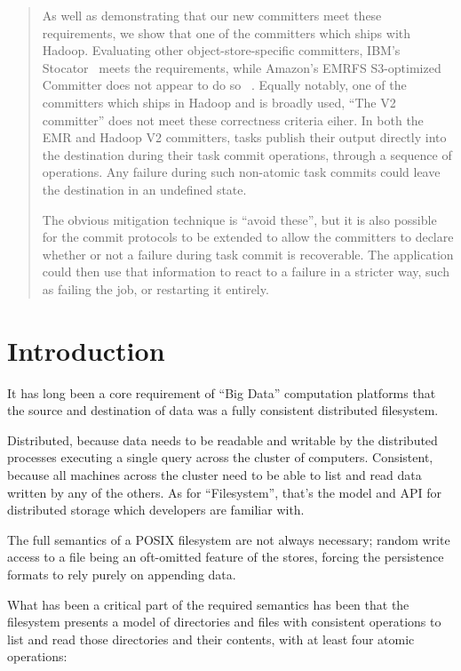\documentclass[format=acmsmall, screen=true, review=false]{acmart}
\begin{document}
\begin{abstract}
As well as demonstrating that our new committers meet these requirements,
we show that one of the committers which ships with Hadoop.
Evaluating other object-store-specific committers, IBM's Stocator\ \cite{Stocator}
meets the requirements, while Amazon's EMRFS S3-optimized Committer does not
appear to do so \ \cite{AWS-EMR-committer}.
Equally notably, one of the committers which ships in Hadoop and is broadly used,
``The V2 committer'' does not meet these correctness criteria eiher.
In both the EMR and Hadoop V2 committers, tasks publish their output directly
into the destination during their task commit operations, through a sequence of
operations.
Any failure during such non-atomic task commits could leave the
destination in an undefined state.

The obvious mitigation technique is ``avoid these'', but it is also
possible for the commit protocols to be extended to allow the committers
to declare whether or not a failure during task commit is recoverable.
The application could then use that information to react to a failure
in a stricter way, such as failing the job, or restarting it entirely.

\end{abstract}


\section{Introduction}
\label{sec:introduction}

It has long been a core requirement of ``Big Data'' computation platforms that
the source and destination of data was a fully consistent distributed filesystem.

Distributed, because data needs to be readable and writable by the distributed
processes executing a single query across the cluster of computers.
Consistent, because all machines across the cluster need to be able to
list and read data written by any of the others.
As for ``Filesystem'', that's the model and API for distributed storage which
developers are familiar with.


The full semantics of a POSIX filesystem are not always necessary;
random write access to a file being an oft-omitted feature of the stores,
forcing the persistence formats to rely purely on appending data.

What has been a critical part of the required semantics has been that the filesystem
presents a model of directories and files with consistent operations to list and
read those directories and their contents, with at least four atomic operations:
\end{document}
